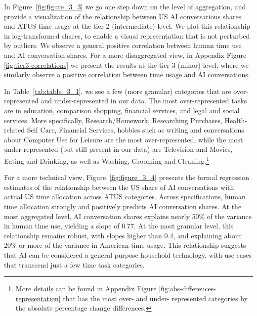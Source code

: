 \documentclass[11pt,a4paper]{article}
\begin{document}
In Figure~\ref{fig:figure_3_3} we go one step down on the level of aggregation, and provide a visualization of the relationship between US AI conversations shares and ATUS time usage at the tier 2 (intermediate) level. We plot this relationship in log-transformed shares, to enable a visual representation that is not perturbed by outliers. We observe a general positive correlation between human time use and AI conversation shares. For a more disaggregated view, in Appendix Figure \ref{fig:tier3-correlations} we present the results at the tier 3 (minor) level, where we similarly observe a positive correlation between time usage and AI conversations.

In Table~\ref{tab:table_3_1}, we see a few (more granular) categories that are over-represented and under-represented in our data. The most over-represented tasks are in education, comparison shopping, financial services, and legal and social services. More specifically, Research/Homework, Researching Purchases, Health-related Self Care, Financial Services, hobbies such as writing and conversations about Computer Use for Leisure are the most over-represented, while the most under-represented (but still present in our data) are Television and Movies, Eating and Drinking, as well as Washing, Grooming and Cleaning.\footnote{More details can be found in Appendix Figure \ref{fig:abs-differences-representation} that has the most over- and under- represented categories by the absolute percentage change differences.}

For a more technical view, Figure~\ref{fig:figure_3_4} presents the formal regression estimates of the relationship between the US share of AI conversations with actual US time allocation across ATUS categories. Across specifications, human time allocation strongly and positively predicts AI conversation shares. At the most aggregated level, AI conversation shares explains nearly 50\% of the variance in human time use, yielding a slope of 0.77. At the most granular level, this relationship remains robust, with slopes higher than 0.4, and explaining about 20\% or more of the variance in American time usage. This relationship suggests that AI can be considered a general purpose household technology, with use cases that transcend just a few time task categories.
\end{document}
